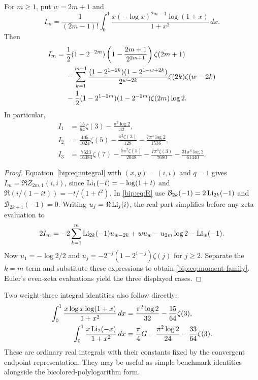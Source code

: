 \begin{corollary}
For $m\ge1$, put $w=2m+1$ and
\[
 I_m=\frac1{(2m-1)!}\int_0^1
       \frac{x(-\log x)^{2m-1}\log(1+x)}{1+x^2}\,dx.
\]
Then
\begin{align}
 I_m={}&\frac12(1-2^{-2m})
        \left(1-\frac{2m+1}{2^{2m+1}}\right)\zeta(2m+1)\notag\\
 &-\sum_{k=1}^{m-1}
  \frac{(1-2^{1-2k})(1-2^{1-w+2k})}{2^{w-2k}}
       \zeta(2k)\zeta(w-2k)\notag\\
 &-\frac12(1-2^{1-2m})(1-2^{-2m})\zeta(2m)\log2.
 \label{bip:eq:moment-family}
\end{align}
In particular,
\begin{align*}
 I_1&=\frac{15}{64}\zeta(3)-\frac{\pi^2\log2}{32},\\
 I_2&=\frac{405}{1024}\zeta(5)-\frac{\pi^2\zeta(3)}{128}
                     -\frac{7\pi^4\log2}{1536},\\
 I_3&=\frac{7623}{16384}\zeta(7)-\frac{5\pi^2\zeta(5)}{2048}
       -\frac{7\pi^4\zeta(3)}{7680}-\frac{31\pi^6\log2}{61440}.
\end{align*}
\end{corollary}
\begin{proof}
Equation~\eqref{bip:eq:integral} with $(x,y)=(i,i)$ and $q=1$
gives $I_m=\Re Z_{2m,1}(i,i)$, since
$\operatorname{Li}_1(-t)=-\log(1+t)$ and $\Re(i/(1-it))=-t/(1+t^2)$.
In \eqref{bip:eq:R} use
$\mathcal B_{2k}(-1)=2\operatorname{Li}_{2k}(-1)$ and
$\mathcal B_{2k+1}(-1)=0$. Writing
$u_j=\Re\operatorname{Li}_j(i)$, the real part simplifies before any
zeta evaluation to
\[
 2I_m=-2\sum_{k=1}^{m}\operatorname{Li}_{2k}(-1)u_{w-2k}
           +w u_w-u_{2m}\log2-\operatorname{Li}_w(-1).
\]
Now $u_1=-\log2/2$ and
$u_j=-2^{-j}(1-2^{1-j})\zeta(j)$ for $j\ge2$.
Separate the $k=m$ term and substitute these expressions to obtain
\eqref{bip:eq:moment-family}.  Euler's even-zeta evaluations yield
the three displayed cases.
\end{proof}

Two weight-three integral identities also follow directly:
\begin{align*}
 \int_0^1\frac{x\log x\log(1+x)}{1+x^2}\,dx
  &=\frac{\pi^2\log2}{32}-\frac{15}{64}\zeta(3),\\
 \int_0^1\frac{x\operatorname{Li}_2(-x)}{1+x^2}\,dx
  &=\frac\pi4G-\frac{\pi^2\log2}{24}-\frac{33}{64}\zeta(3).
\end{align*}
These are ordinary real integrals with their constants fixed by the
convergent endpoint representation. They may be useful as simple
benchmark identities alongside the bicolored-polylogarithm form.

